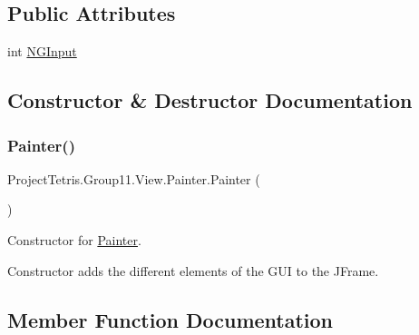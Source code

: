 \subsection*{Public Attributes}
\begin{DoxyCompactItemize}
\item 
int \hyperlink{class_project_tetris_1_1_group11_1_1_view_1_1_painter_ae72e4845df48232ad82e76f0f2f3fa77}{N\+G\+Input}
\end{DoxyCompactItemize}


\subsection{Constructor \& Destructor Documentation}
\hypertarget{class_project_tetris_1_1_group11_1_1_view_1_1_painter_a0a0ad457a5bce0f4292bedd3cefd5201}{}\label{class_project_tetris_1_1_group11_1_1_view_1_1_painter_a0a0ad457a5bce0f4292bedd3cefd5201} 
\subsubsection{\texorpdfstring{Painter()}{Painter()}}
{\footnotesize\ttfamily Project\+Tetris.\+Group11.\+View.\+Painter.\+Painter (\begin{DoxyParamCaption}{ }\end{DoxyParamCaption})}



Constructor for \hyperlink{class_project_tetris_1_1_group11_1_1_view_1_1_painter}{Painter}. 

Constructor adds the different elements of the G\+UI to the J\+Frame. 

\subsection{Member Function Documentation}
\hypertarget{class_project_tetris_1_1_group11_1_1_view_1_1_painter_a37087ff7a1129d874296ec5bb3ef09d1}{}\label{class_project_tetris_1_1_group11_1_1_view_1_1_painter_a37087ff7a1129d874296ec5bb3ef09d1} 
